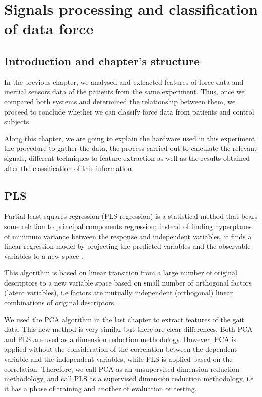 \chapter{Signals processing and classification of data force}
\label{ch:forceData}

\section{Introduction and chapter's structure}
In the previous chapter, we analysed and extracted features of force data and inertial sensors data of the patients from the same experiment. Thus, once we compared both systems and determined the relationship between them, we proceed to conclude whether we can classify force data from patients and control subjects.

Along this chapter, we are going to explain the hardware used in this experiment, the procedure to gather the data, the process carried out to calculate the relevant signals, different techniques to feature extraction as well as the results obtained after the classification of this information.

\section{PLS}
Partial least squares regression (PLS regression) is a statistical method that bears some relation to principal components regression; instead of finding hyperplanes of minimum variance between the response and independent variables, it finds a linear regression model by projecting the predicted variables and the observable variables to a new space \cite{pls_pca}. 

This algorithm is based on linear transition from a large number of original descriptors to a new variable space based on small number of orthogonal factors (latent variables), i.e factors are mutually independent (orthogonal) linear combinations of original descriptors \cite{pls_pca} .

We used the PCA algorithm in the last chapter to extract features of the gait data. This new method is very similar but there are clear differences. Both PCA and PLS are used as a dimension reduction methodology. However, PCA is applied without the consideration of the correlation between the dependent variable and the independent variables, while PLS is applied based on the correlation. Therefore, we call PCA as an unsupervised dimension reduction methodology, and call PLS as a supervised dimension reduction methodology, i.e it has a phase of training and another of evaluation or testing\cite{pls_pca}.

